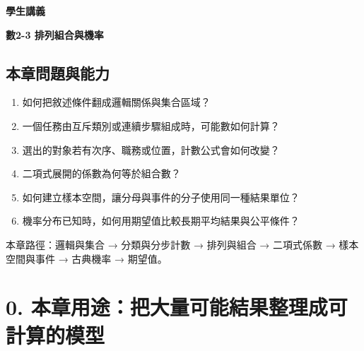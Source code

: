 \documentclass[11pt,a4paper]{article}
\providecommand{\tightlist}{%
  \setlength{\itemsep}{0pt}\setlength{\parskip}{0pt}}
\begin{document}
\begin{tcolorbox}[
  enhanced,colback=white,colframe=HandoutBlue,boxrule=1.1pt,arc=2mm,
  borderline west={3pt}{0pt}{HandoutBlue},left=5mm,right=4mm,top=4mm,bottom=4mm
]
{\sffamily\small\bfseries\color{HandoutBlue}學生講義}\par
{\sffamily\bfseries\LARGE\color{HandoutInk}數2-3 排列組合與機率}\par
\vspace{0.35em}{\large 以分類、排序與樣本空間計算可能數，再用機率與期望值比較不確定結果}\par
{}\par
{}\par
\end{tcolorbox}


\begin{HandoutLearningMap}

\subsection{本章問題與能力}\label{ux672cux7ae0ux554fux984cux8207ux80fdux529b}

\begin{enumerate}
\def\labelenumi{\arabic{enumi}.}
\tightlist
\item
  如何把敘述條件翻成邏輯關係與集合區域？
\item
  一個任務由互斥類別或連續步驟組成時，可能數如何計算？
\item
  選出的對象若有次序、職務或位置，計數公式會如何改變？
\item
  二項式展開的係數為何等於組合數？
\item
  如何建立樣本空間，讓分母與事件的分子使用同一種結果單位？
\item
  機率分布已知時，如何用期望值比較長期平均結果與公平條件？
\end{enumerate}

本章路徑：邏輯與集合 → 分類與分步計數 → 排列與組合 → 二項式係數 → 樣本空間與事件 → 古典機率 → 期望值。

\end{HandoutLearningMap}

\section{0. 本章用途：把大量可能結果整理成可計算的模型}\label{ux672cux7ae0ux7528ux9014ux628aux5927ux91cfux53efux80fdux7d50ux679cux6574ux7406ux6210ux53efux8a08ux7b97ux7684ux6a21ux578b}
\end{document}
